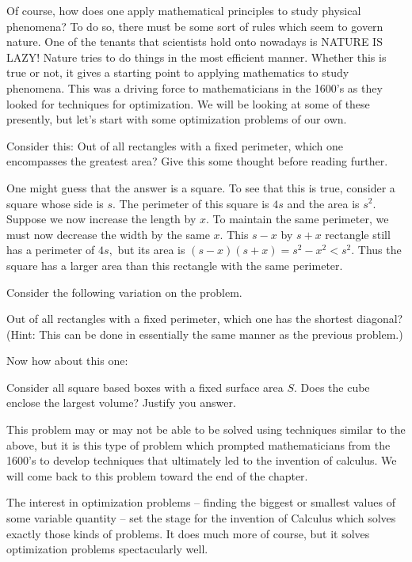 Of course, how does one apply
mathematical principles to study physical phenomena?  To do so, there
must be some sort of rules which seem to govern nature.  One of the
tenants that scientists hold onto nowadays is NATURE IS LAZY!  Nature
tries to do things in the most efficient manner.  Whether this is true
or not, it gives a starting point to applying mathematics to study
phenomena.  This was a driving force to mathematicians in the 1600’s
as they looked for techniques for optimization.  We will be looking at
some of these presently, but let’s start with some optimization
problems of our own.
 
Consider this: Out of all rectangles with a fixed perimeter, which one
encompasses the greatest area? Give this some thought before reading
further.


One might guess that the answer is a square.  To see that this is
true, consider a square whose side is $s$.  The perimeter of this
square is $4s$ and the area is $s^2.$  Suppose we now increase the
length by $x.$  To maintain the same perimeter, we must now decrease
the width by the same $x.$  This $s-x$ by $s+x$ rectangle still has a
perimeter of $4s,$ but its area is $(s-x)(s+x)=s^2-x^2<s^2.$  Thus the
square has a larger area than this rectangle with the same perimeter. 


Consider the following variation on the problem.
 \begin{embeddedproblem}{}
   Out of all rectangles with a fixed perimeter, which one has the
   shortest diagonal? (Hint: This can be done in essentially the same
   manner as the previous problem.)
 \end{embeddedproblem}

Now how about this one:
\begin{embeddedproblem}{}
  Consider all square based boxes with a fixed surface area $S.$ Does
  the cube enclose the largest volume?  Justify you answer.
\end{embeddedproblem}

This problem may or may not be able to be solved using techniques
similar to the above, but it is this type of problem which prompted
mathematicians from the 1600’s to develop techniques that ultimately
led to the invention of calculus.  We will come back to this problem
toward the end of the chapter.  
\endaptta{}

The interest in optimization problems -- finding the biggest or
smallest values of some variable quantity -- set the stage for the
invention of Calculus which solves exactly those kinds of problems. It
does much more of course, but it solves optimization problems
spectacularly well.

